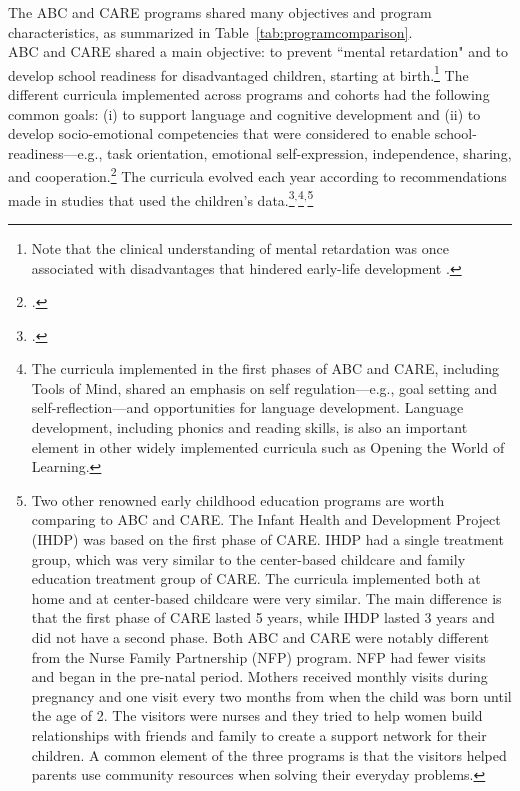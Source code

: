 \noindent The ABC and CARE programs shared many objectives and program characteristics, as summarized in Table~\ref{tab:programcomparison}.\\



\noindent ABC and CARE shared a main objective: to prevent ``mental retardation" and to develop school readiness for disadvantaged children, starting at birth.\footnote{Note that the clinical understanding of mental retardation was once associated with disadvantages that hindered early-life development \citep{Mental-Retardation_America_2004_BOOK_NYU}.} The different curricula implemented across programs and cohorts had the following common goals: (i) to support language and cognitive development and (ii) to develop socio-emotional competencies that were considered to enable school-readiness---e.g., task orientation, emotional self-expression, independence, sharing, and cooperation.\footnote{\citet{Sparling_1974_Synth_Edu_Infant_SPEECH,Ramey_Collier_etal_1976_CarolinaAbecedarianProject,Ramey-etal_2012-ABC}.} The curricula evolved each year according to recommendations made in studies that used the children's data.\footnote{\citet{Ramey-etal_1975_AJoMD,Finkelstein_1982_Day_Care_YC,Haskins_1985_CD}.}$^{,}$\footnote{The curricula implemented in the first phases of ABC and CARE, including Tools of Mind, shared an emphasis on self regulation---e.g., goal setting and self-reflection---and opportunities for language development. Language development, including phonics and reading skills, is also an important element in other widely implemented curricula such as Opening the World of Learning.}$^{,}$\footnote{Two other renowned early childhood education programs are worth comparing to ABC and CARE. The Infant Health and Development Project (IHDP) was based on the first phase of CARE. IHDP had a single treatment group, which was very similar to the center-based childcare and family education treatment group of CARE. The curricula implemented both at home and at center-based childcare were very similar. The main difference is that the first phase of CARE lasted 5 years, while IHDP lasted 3 years and did not have a second phase. Both ABC and CARE were notably different from the Nurse Family Partnership (NFP) program. NFP had fewer visits and began in the pre-natal period. Mothers received monthly visits during pregnancy and one visit every two months from when the child was born until the age of 2. The visitors were nurses and they tried to help women build relationships with friends and family to create a support network for their children. A common element of the three programs is that the visitors helped parents use community resources when solving their everyday problems.}\\

